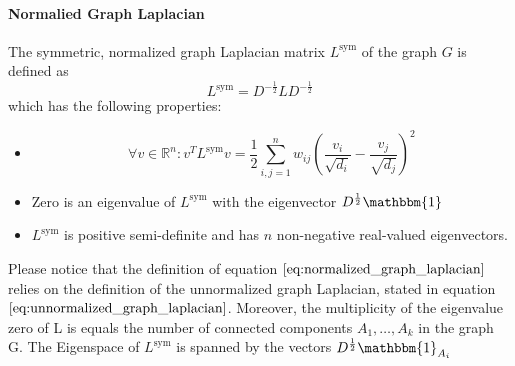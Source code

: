 \paragraph{Normalied Graph Laplacian}
The symmetric, normalized graph Laplacian matrix $L^{\text{sym}}$ of the graph $G$ is defined as
\begin{equation}
	L^{\text{sym}} = D^{-\frac{1}{2}} L D^{-\frac{1}{2}}
\label{eq:normalized_graph_laplacian}	
\end{equation}
which has the following properties: 
\begin{itemize}
\item \begin{equation}
	\forall v \in \mathbb{R}^n: v^T L^{\text{sym}} v = \frac{1}{2	} \sum_{i,j=1}^n w_{ij} \left( \frac{v_i}{\sqrt{d_i}} - \frac{v_j}{\sqrt{d_j}} \right)^2
\end{equation}
\item Zero is an eigenvalue of $L^{\text{sym}}$ with the eigenvector $D^{\frac{1}{2}} \mathbbm{1}$
\item $L^{\text{sym}}$ is positive semi-definite and has $n$ non-negative real-valued eigenvectors.
\end{itemize}
Please notice that the definition of equation $\ref{eq:normalized_graph_laplacian}$ relies on the definition of the unnormalized graph Laplacian, stated in equation $\ref{eq:unnormalized_graph_laplacian}$. Moreover, the multiplicity of the eigenvalue zero of L is equals the number of connected components $A_1, \dots, A_k$ in the graph G. The Eigenspace of $L^{\text{sym}}$ is spanned by the vectors $D^{\frac{1}{2}} \mathbbm{1}_{A_i}$

